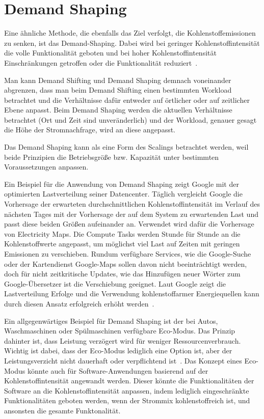 \section{Demand Shaping}
Eine ähnliche Methode, die ebenfalls das Ziel verfolgt, die Kohlenstoffemissionen zu senken, ist das Demand-Shaping.
Dabei wird bei geringer Kohlenstoffintensität die volle Funktionalität geboten und bei hoher Kohlenstoffintensität Einschränkungen getroffen oder die Funktionalität reduziert~\cite{Currie.2024}.

\noindent Man kann Demand Shifting und Demand Shaping demnach voneinander abgrenzen, dass man beim Demand Shifting einen bestimmten Workload betrachtet und die Verhältnisse dafür entweder auf örtlicher oder auf zeitlicher Ebene anpasst.
Beim Demand Shaping werden die aktuellen Verhältnisse betrachtet (Ort und Zeit sind unveränderlich) und der Workload, genauer gesagt die Höhe der Stromnachfrage, wird an diese angepasst.

Das Demand Shaping kann als eine Form des Scalings betrachtet werden, weil beide Prinzipien die Betriebsgröße bzw. Kapazität unter bestimmten Voraussetzungen anpassen.

Ein Beispiel für die Anwendung von Demand Shaping zeigt Google mit der optimierten Lastverteilung seiner Datencenter.
Täglich vergleicht Google die Vorhersage der erwarteten durchschnittlichen Kohlenstoffintensität im Verlauf des nächsten Tages mit der Vorhersage der auf dem System zu erwartenden Last und passt diese beiden Größen aufeinander an.
Verwendet wird dafür die Vorhersage von Electricity Maps.
Die Compute Tasks werden Stunde für Stunde an die Kohlenstoffwerte angepasst, um möglichst viel Last auf Zeiten mit geringen Emissionen zu verschieben.
Rundum verfügbare Services, wie die Google-Suche oder der Kartendienst Google-Maps sollen davon nicht beeinträchtigt werden, doch für nicht zeitkritische Updates, wie das Hinzufügen neuer Wörter zum Google-Übersetzer ist die Verschiebung geeignet.
Laut Google zeigt die Lastverteilung Erfolge und die Verwendung kohlenstoffarmer Energiequellen kann durch diesen Ansatz erfolgreich erhöht werden~\cite{Radovanovic.22.4.2020}.

Ein allgegenwärtiges Beispiel für Demand Shaping ist der bei Autos, Waschmaschinen oder Spülmaschinen verfügbare Eco-Modus.
Das Prinzip dahinter ist, dass Leistung verzögert wird für weniger Ressourcenverbrauch.
Wichtig ist dabei, dass der Eco-Modus lediglich eine Option ist, aber der Leistungsverzicht nicht dauerhaft oder verpflichtend ist~\cite{GreenSoftwareFoundation.2022}.
Das Konzept eines Eco-Modus könnte auch für Software-Anwendungen basierend auf der Kohlenstoffintensität angewandt werden.
Dieser könnte die Funktionalitäten der Software an die Kohlenstoffintensität anpassen, indem lediglich eingeschränkte Funktionalitäten geboten werden, wenn der Strommix \glqq kohlenstoffreich\grqq{} ist, und ansonsten die gesamte Funktonalität.

